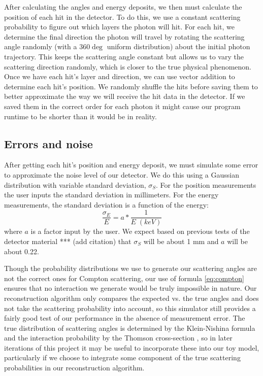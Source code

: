 After calculating the angles and energy deposits, we then must calculate the position of each hit in the detector. To do this, we use a constant scattering probability to figure out which layers the photon will hit. For each hit, we determine the final direction the photon will travel by rotating the scattering angle randomly (with a 360$\deg$ uniform distribution) about the initial photon trajectory. This keeps the scattering angle constant but allows us to vary the scattering direction randomly, which is closer to the true physical phenomenon. Once we have each hit's layer and direction, we can use vector addition to determine each hit's position. We randomly shuffle the hits before saving them to better approximate the way we will receive the hit data in the detector. If we saved them in the correct order for each photon it might cause our program runtime to be shorter than it would be in reality.

\subsection{Errors and noise}
After getting each hit's position and energy deposit, we must simulate some error to approximate the noise level of our detector. We do this using a Gaussian distribution with variable standard deviation, $\sigma_S$. For the position measurements the user inputs the standard deviation in millimeters. For the energy measurements, the standard deviation is a function of the energy:
\begin{equation}\label{eq:sigE}
\frac{\sigma_E}{E} = a*\frac{1}{E \; (keV)}
\end{equation}
where $a$ is a factor input by the user. We expect based on previous tests of the detector material \cite{}*** (add citation) that $\sigma_S$ will be about 1 mm and $a$ will be about 0.22.

Though the probability distributions we use to generate our scattering angles are not the correct ones for Compton scattering, our use of formula \ref{eq:compton} ensures that no interaction we generate would be truly impossible in nature. Our reconstruction algorithm only compares the expected vs. the true angles and does not take the scattering probability into account, so this simulator still provides a fairly good test of our performance in the absence of measurement error. The true distribution of scattering angles is determined by the Klein-Nishina formula and the interaction probability by the Thomson cross-section \cite{klein-nishina}, so in later iterations of this project it may be useful to incorporate these into our toy model, particularly if we choose to integrate some component of the true scattering probabilities in our reconstruction algorithm.

